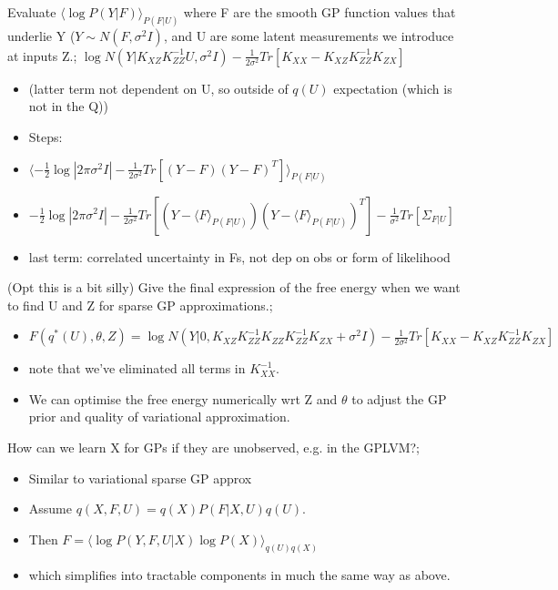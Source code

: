 \documentclass{article}
\begin{document}
Evaluate $\langle \log P(Y|F)\rangle_{P(F|U)}$ where F are the smooth GP function values that underlie Y ($Y\sim N(F, \sigma^2I)$, and U are some latent measurements we introduce at inputs Z.; $\log N(Y|K_{XZ}K_{ZZ}^{-1}U, \sigma^2I)-\frac{1}{2\sigma^2}Tr[K_{XX}-K_{XZ}K_{ZZ}^{-1}K_{ZX}]$
    \begin{itemize}
        \item (latter term not dependent on U, so outside of $q(U)$ expectation (which is not in the Q))
        \item Steps:
        \item $\langle -\frac{1}{2}\log|2\pi\sigma^2I|-\frac{1}{2\sigma^2}Tr[(Y-F)(Y-F)^T]\rangle_{P(F|U)}$
        \item $-\frac{1}{2}\log|2\pi\sigma^2I|-\frac{1}{2\sigma^2}Tr[(Y-\langle F\rangle_{P(F|U)})(Y-\langle F\rangle_{P(F|U)})^T]-\frac{1}{\sigma^2}Tr[\Sigma_{F|U}]$
        \item last term: correlated uncertainty in Fs, not dep on obs or form of likelihood
    \end{itemize}

(Opt this is a bit silly) Give the final expression of the free energy when we want to find U and Z for sparse GP approximations.; \begin{itemize}
    \item $F(q^*(U), \theta, Z)=\log N(Y|0, K_{XZ}K^{-1}_{ZZ}K_{ZZ}K_{ZZ}^{-1}K_{ZX}+\sigma^2I) -\frac{1}{2\sigma^2}Tr[K_{XX}-K_{XZ}K_{ZZ}^{-1}K_{ZX}]$
    \item note that we've eliminated all terms in $K_{XX}^{-1}$.
    \item We can optimise the free energy numerically  wrt Z and $\theta$ to adjust the GP prior and quality of variational approximation.
\end{itemize}

How can we learn X for GPs if they are unobserved, e.g. in the GPLVM?; \begin{itemize}
    \item Similar to variational sparse GP approx
    \item Assume $q(X, F, U)=q(X)P(F|X, U)q(U)$.
    \item Then $F=\langle \log P(Y, F, U|X)\log P(X)\rangle_{q(U)q(X)}$ 
    \item which simplifies into tractable components in much the same way as above.
\end{itemize}
\end{document}
